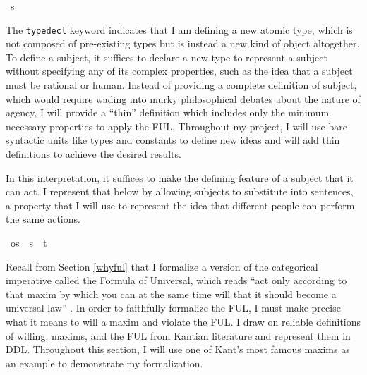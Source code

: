 \begin{isabellebody}
\ s\ %
%
\begin{isamarkuptext}%
The \texttt{typedecl} keyword indicates that I am defining a new atomic type, which is not composed
of pre-existing types but is instead a new kind of object altogether. To define a subject, it suffices
to declare a new type to represent a subject without specifying any of its complex properties, such as the idea that a subject
must be rational or human. Instead of providing a complete definition of subject, which would require wading into murky
philosophical debates about the nature of agency, I will provide a ``thin'' definition which includes
only the minimum necessary properties to apply the FUL. Throughout my project, I will use bare syntactic units like types and constants
to define new ideas and will add thin definitions to achieve the desired results.

In this interpretation, it suffices to make the defining feature of a subject that it can act. 
I represent that below by allowing subjects to substitute into sentences, a property that I will use 
to represent the idea that different people can perform the same actions.%
\end{isamarkuptext}\isamarkuptrue%
\isamarkupfalse%
\ os\ {\isacharequal}\ {\isachardoublequoteopen}{\isacharparenleft}s\ {\isasymRightarrow}\ t{\isacharparenright}{\isachardoublequoteclose}\ \isanewline
%
%
\isadelimdocument
%
\endisadelimdocument
%
\isatagdocument
%
\isamarkuptrue%
%
\endisatagdocument
{\isafolddocument}%
%
\isadelimdocument
%
\endisadelimdocument
%
\begin{isamarkuptext}%
Recall from Section \ref{whyful} that I formalize a version of the categorical imperative called
the Formula of Universal, which reads ``act only according to that maxim by which you can at the same 
time will that it should become a universal law'' \citep{groundwork}. In order to faithfully formalize
the FUL, I must make precise what it means to will a maxim and violate the FUL. I draw on 
reliable definitions of willing, maxims, and the FUL from Kantian literature and represent them in DDL.
Throughout this section, I will use one of Kant's most famous maxims as an example to demonstrate
my formalization.


\end{isamarkuptext}
\end{isabellebody}
